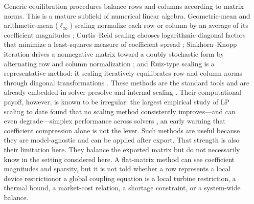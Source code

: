 \documentclass[AMA,Times1COL]{WileyNJDv5} %
\providecommand{\DIFadd}[1]{{\protect\color{blue} \sf #1}} %
\providecommand{\DIFdel}[1]{{\protect\color{red} \scriptsize #1}} %
\providecommand{\DIFaddbegin}{} %
\providecommand{\DIFaddend}{} %
\providecommand{\DIFdelbegin}{} %
\providecommand{\DIFdelend}{} %
\begin{document}
\DIFaddend Generic equilibration procedures balance rows and columns according to matrix norms.
\DIFaddbegin \DIFadd{This is a mature subfield of numerical linear algebra. Geometric-mean and
arithmetic-mean ($\ell_\infty$) scaling normalize each row or column by an average of its
coefficient magnitudes \cite{tomlin1975scaling}; Curtis--Reid scaling chooses logarithmic
diagonal factors that minimize a least-squares measure of coefficient spread
\cite{curtisreid1972}; Sinkhorn--Knopp iteration drives a nonnegative matrix toward a
doubly stochastic form by alternating row and column normalization \cite{sinkhorn1967};
and }\DIFaddend Ruiz-type \DIFdelbegin \DIFdel{scaling is a representative method: it }\DIFdelend \DIFaddbegin \DIFadd{scaling }\DIFaddend iteratively equilibrates row and column norms through diagonal
transformations \DIFdelbegin \DIFdel{\citep{ruiz2001scaling}}\DIFdelend \DIFaddbegin \DIFadd{\cite{ruiz2001scaling}. These methods are the standard tools and are
already embedded in solver presolve and internal scaling \cite{achterberg2020presolve}.
Their computational payoff, however, is known to be irregular: the largest empirical study
of LP scaling to date found that no scaling method consistently improves---and can even
degrade---simplex performance across solvers \cite{elble2012scaling}, an early warning that
coefficient compression alone is not the lever}\DIFaddend .
Such methods are useful because they are model-agnostic \DIFaddbegin \DIFadd{and can be applied after export}\DIFaddend .
That strength is also their limitation \DIFdelbegin \DIFdel{here. They balance
the exported matrix but do not necessarily know }\DIFdelend \DIFaddbegin \DIFadd{in the setting considered here. A flat-matrix method
can see coefficient magnitudes and sparsity, but it is not told }\DIFaddend whether a row \DIFdelbegin \DIFdel{represents a local
device
restrictionor a global coupling equation}\DIFdelend \DIFaddbegin \DIFadd{is a local
turbine restriction, a thermal bound, a market-cost relation, a shortage constraint, or a
system-wide balance}\DIFaddend .
\end{document}
